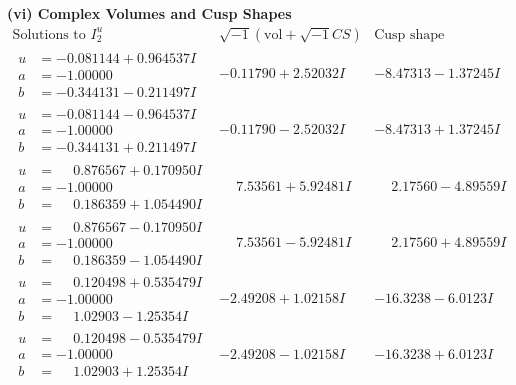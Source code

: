 \documentclass[1p]{elsarticle_modified}
\theoremstyle{definition}
\newcommand{\I}{\sqrt{-1}}
\begin{document}
\newpage\flushleft \textbf{(vi) Complex Volumes and Cusp Shapes}
$$\begin{array}{c|c|c}  
\text{Solutions to }I^u_{2}& \I (\text{vol} + \sqrt{-1}CS) & \text{Cusp shape}\\
 \hline 
\begin{aligned}
u &= -0.081144 + 0.964537 I \\
a &= -1.00000\phantom{ +0.000000I} \\
b &= -0.344131 - 0.211497 I\end{aligned}
 & -0.11790 + 2.52032 I & -8.47313 - 1.37245 I \\ \hline\begin{aligned}
u &= -0.081144 - 0.964537 I \\
a &= -1.00000\phantom{ +0.000000I} \\
b &= -0.344131 + 0.211497 I\end{aligned}
 & -0.11790 - 2.52032 I & -8.47313 + 1.37245 I \\ \hline\begin{aligned}
u &= \phantom{-}0.876567 + 0.170950 I \\
a &= -1.00000\phantom{ +0.000000I} \\
b &= \phantom{-}0.186359 + 1.054490 I\end{aligned}
 & \phantom{-}7.53561 + 5.92481 I & \phantom{-}2.17560 - 4.89559 I \\ \hline\begin{aligned}
u &= \phantom{-}0.876567 - 0.170950 I \\
a &= -1.00000\phantom{ +0.000000I} \\
b &= \phantom{-}0.186359 - 1.054490 I\end{aligned}
 & \phantom{-}7.53561 - 5.92481 I & \phantom{-}2.17560 + 4.89559 I \\ \hline\begin{aligned}
u &= \phantom{-}0.120498 + 0.535479 I \\
a &= -1.00000\phantom{ +0.000000I} \\
b &= \phantom{-}1.02903 - 1.25354 I\end{aligned}
 & -2.49208 + 1.02158 I & -16.3238 - 6.0123 I \\ \hline\begin{aligned}
u &= \phantom{-}0.120498 - 0.535479 I \\
a &= -1.00000\phantom{ +0.000000I} \\
b &= \phantom{-}1.02903 + 1.25354 I\end{aligned}
 & -2.49208 - 1.02158 I & -16.3238 + 6.0123 I \\ \hline\begin{aligned}

\end{aligned}
\end{array}$$
\end{document}
